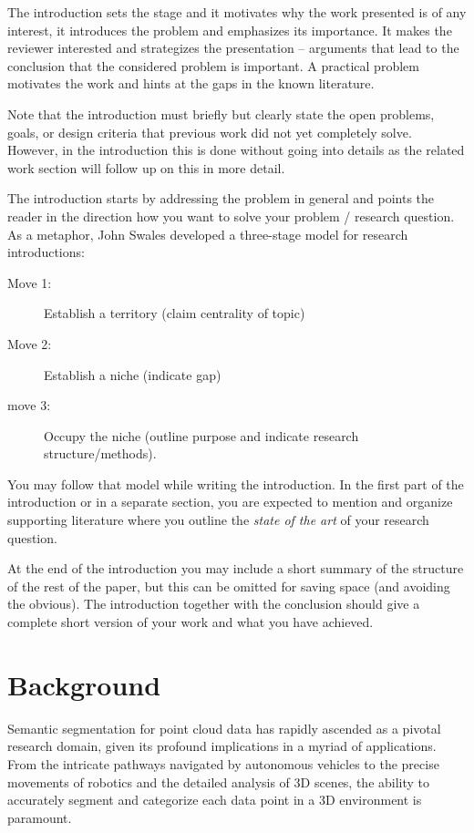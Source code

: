\documentclass[11pt, a4paper,oneside,chapterprefix=false]{scrbook}
\begin{document}
The introduction sets the stage and it motivates why the work presented is of any interest, it introduces the problem and emphasizes its importance. It makes the reviewer interested and strategizes the presentation -- arguments that lead to the conclusion that the considered problem is important. A practical problem motivates the work and hints at the gaps in the known literature.

Note that the introduction must briefly but clearly state the open problems, goals, or design criteria that previous work did not yet completely solve. However, in the introduction this is done without going into details as the related work section will follow up on this in more detail.

The introduction starts by addressing the problem in general and points the reader in the direction how you want to solve your problem / research question. As a metaphor, John Swales developed a three-stage model for research introductions: 

\begin{description}
\item[Move 1:] Establish a territory (claim centrality of topic)
\item[Move 2:] Establish a niche (indicate gap)
\item[move 3:] Occupy the niche (outline purpose and indicate research structure/methods).
\end{description}

You may follow that model while writing the introduction. In the first part of the introduction or in a separate section, you are expected to mention and organize supporting literature where you outline the \emph{state of the art} of your research question.

At the end of the introduction you may include a short summary of the structure of the rest of the paper, but this can be omitted for saving space (and avoiding the obvious). The introduction together with the conclusion should give a complete short version of your work and what you have achieved.

\section{Background}

Semantic segmentation for point cloud data has rapidly ascended as a pivotal research domain, given its profound implications in a myriad of applications. From the intricate pathways navigated by autonomous vehicles to the precise movements of robotics and the detailed analysis of 3D scenes, the ability to accurately segment and categorize each data point in a 3D environment is paramount.
\end{document}
